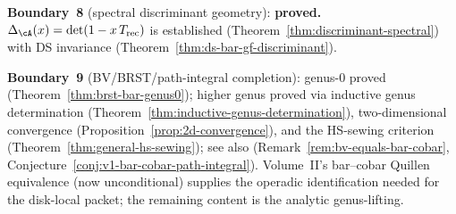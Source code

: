 \noindent\textbf{Boundary~8} (spectral discriminant geometry):
\textbf{proved.}
$\Delta_{\cA}(x) = \det(1 - x\, T_{\mathrm{rec}})$ is established
(Theorem~\ref{thm:discriminant-spectral}) with DS invariance
(Theorem~\ref{thm:ds-bar-gf-discriminant}).

\noindent\textbf{Boundary~9} (BV/BRST/path-integral completion):
genus-$0$ proved (Theorem~\ref{thm:brst-bar-genus0});
higher genus proved via inductive genus determination
(Theorem~\ref{thm:inductive-genus-determination}),
two-dimensional convergence
(Proposition~\ref{prop:2d-convergence}),
and the HS-sewing criterion
(Theorem~\ref{thm:general-hs-sewing}); see also
(Remark~\ref{rem:bv-equals-bar-cobar},
Conjecture~\ref{conj:v1-bar-cobar-path-integral}).
Volume~II's bar--cobar Quillen equivalence (now unconditional)
supplies the operadic identification needed for the disk-local
packet; the remaining content is the analytic genus-lifting.

